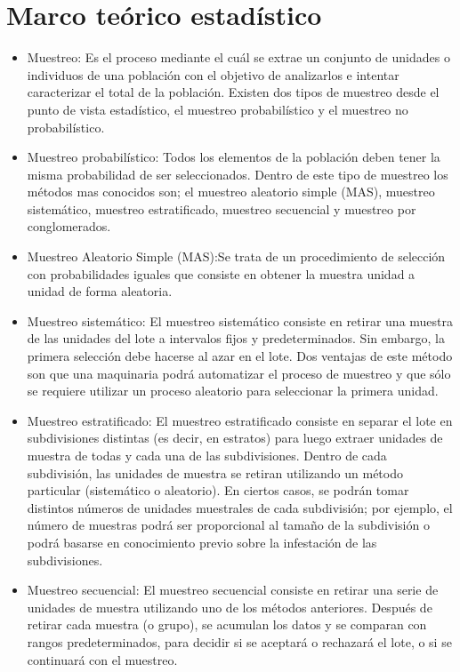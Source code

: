 \section{Marco te\'{o}rico estad\'{i}stico}
\begin{itemize}
\item Muestreo: Es el proceso mediante el cu\'{a}l se extrae un conjunto de unidades o individuos de una poblaci\'{o}n con el objetivo de analizarlos e intentar caracterizar el total de la poblaci\'{o}n. Existen dos tipos de muestreo desde el punto de vista estad\'{i}stico, el muestreo probabil\'{i}stico y el muestreo no probabil\'{i}stico.
\item Muestreo probabil\'{i}stico: Todos los elementos de la poblaci\'{o}n deben tener la misma probabilidad de ser seleccionados. Dentro de este tipo de muestreo los m\'{e}todos mas conocidos son; el muestreo aleatorio simple (MAS), muestreo sistem\'{a}tico, muestreo estratificado, muestreo secuencial y muestreo por conglomerados.
\item Muestreo Aleatorio Simple (MAS):Se trata de un procedimiento de selecci\'{o}n con probabilidades iguales que consiste en obtener la muestra unidad a unidad de forma aleatoria.\cite{M}
\item Muestreo sistem\'{a}tico: El muestreo sistem\'{a}tico consiste en retirar una muestra de las unidades del lote a intervalos fijos y predeterminados. Sin embargo, la primera selecci\'{o}n debe hacerse al azar en el lote. Dos ventajas de este m\'{e}todo son que una maquinaria podr\'{a} automatizar el proceso de muestreo y que s\'{o}lo se requiere utilizar un proceso aleatorio para seleccionar la primera unidad.\cite{MUES}
\item Muestreo estratificado: El muestreo estratificado consiste en separar el lote en subdivisiones distintas (es decir, en estratos) para luego extraer
unidades de muestra de todas y cada una de las subdivisiones. Dentro de cada subdivisi\'{o}n, las unidades de muestra se retiran utilizando un m\'{e}todo particular (sistem\'{a}tico o aleatorio). En ciertos casos, se podr\'{a}n tomar distintos n\'{u}meros de unidades muestrales de cada subdivisi\'{o}n; por ejemplo, el n\'{u}mero de muestras podr\'{a} ser proporcional al tama\~{n}o de la subdivisi\'{o}n o podr\'{a} basarse en conocimiento previo sobre la infestaci\'{o}n de las subdivisiones.\cite{MUES}
\item Muestreo secuencial: El muestreo secuencial consiste en retirar una serie de unidades de muestra utilizando uno de los m\'{e}todos anteriores. Despu\'{e}s de retirar cada muestra (o grupo), se acumulan los datos y se comparan con rangos predeterminados, para decidir si se aceptar\'{a} o rechazar\'{a} el lote, o si se continuar\'{a} con el muestreo.\cite{MUES}

\end{itemize}
